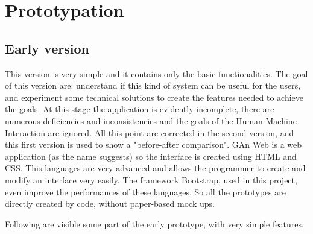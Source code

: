 
\chapter{Prototypation} %

\label{Chapter4} %


\section{Early version}

This version is very simple and it contains only the basic functionalities. 
The goal of this version are: understand if this kind of system can be useful for the users, and experiment some technical solutions to create the features needed to achieve the goals. At this stage the application is evidently incomplete, there are numerous deficiencies and inconsistencies and the goals of the Human Machine Interaction are ignored. All this point are corrected in the second version, and this first version is used to show a "before-after comparison".
GAn Web is a web application (as the name suggests) so the interface is created using HTML and CSS. This languages are very advanced and allows the programmer to create and modify an interface very easily. The framework Bootstrap, used in this project, even improve the performances of these languages. So all the prototypes are directly created by code, without paper-based mock ups.

Following are visible some part of the early prototype, with very simple features.

